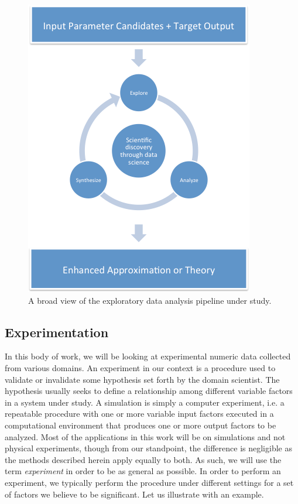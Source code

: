 \begin{figure}[t]
  \centering
  \includegraphics[width=.55\textwidth]{figs/chap1/dataCycle}
  \caption[Data Collection Cycle for Scientific Discovery]{A broad view of the exploratory data analysis pipeline under study.}
  \label{fig:dataCycle}
\end{figure}

\subsection{Experimentation}

In this body of work, we will be looking at experimental numeric data collected from various domains.
%
An experiment in our context is a procedure used to validate or invalidate some hypothesis set forth by the domain scientist.
%
The hypothesis usually seeks to define a relationship among different variable factors in a system under study.
%
A simulation is simply a computer experiment, i.e. a repeatable procedure with one or more variable input factors executed in a computational environment that produces one or more output factors to be analyzed.
%
Most of the applications in this work will be on simulations and not physical experiments, though from our standpoint, the difference is negligible as the methods described herein apply equally to both.
%
As such, we will use the term \textit{experiment} in order to be as general as possible.
%
In order to perform an experiment, we typically perform the procedure under different settings for a set of factors we believe to be significant.
%
Let us illustrate with an example.

